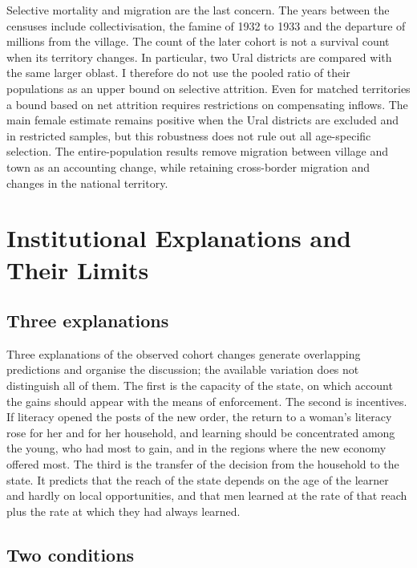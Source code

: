 \documentclass[12pt]{article}
\begin{document}
Selective mortality and migration are the last concern. The years between the censuses include collectivisation, the famine of 1932 to 1933 and the departure of millions from the village. The count of the later cohort is not a survival count when its territory changes. In particular, two Ural districts are compared with the same larger oblast. I therefore do not use the pooled ratio of their populations as an upper bound on selective attrition. Even for matched territories a bound based on net attrition requires restrictions on compensating inflows. The main female estimate remains positive when the Ural districts are excluded and in restricted samples, but this robustness does not rule out all age-specific selection. The entire-population results remove migration between village and town as an accounting change, while retaining cross-border migration and changes in the national territory.


\section{Institutional Explanations and Their Limits}\label{sec:why}

\subsection{Three explanations}

Three explanations of the observed cohort changes generate overlapping predictions and organise the discussion; the available variation does not distinguish all of them. The first is the capacity of the state, on which account the gains should appear with the means of enforcement. The second is incentives. If literacy opened the posts of the new order, the return to a woman's literacy rose for her and for her household, and learning should be concentrated among the young, who had most to gain, and in the regions where the new economy offered most. The third is the transfer of the decision from the household to the state. It predicts that the reach of the state depends on the age of the learner and hardly on local opportunities, and that men learned at the rate of that reach plus the rate at which they had always learned.

\subsection{Two conditions}
\end{document}
